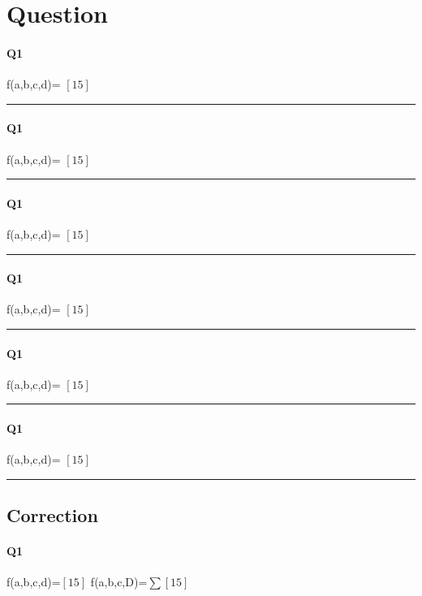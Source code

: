 
\section{Question}

\paragraph{Q1}


f(a,b,c,d)= $[15]$

\hrule width 1\linewidth
\paragraph{Q1}


f(a,b,c,d)= $[15]$

\hrule width 1\linewidth
\paragraph{Q1}


f(a,b,c,d)= $[15]$

\hrule width 1\linewidth
\paragraph{Q1}


f(a,b,c,d)= $[15]$

\hrule width 1\linewidth
\paragraph{Q1}


f(a,b,c,d)= $[15]$

\hrule width 1\linewidth
\paragraph{Q1}


f(a,b,c,d)= $[15]$

\hrule width 1\linewidth\pagebreak
\subsection{Correction}

\paragraph{Q1}

f(a,b,c,d)=$[15]$
f(a,b,c,D)=$ \sum [15] $ 

